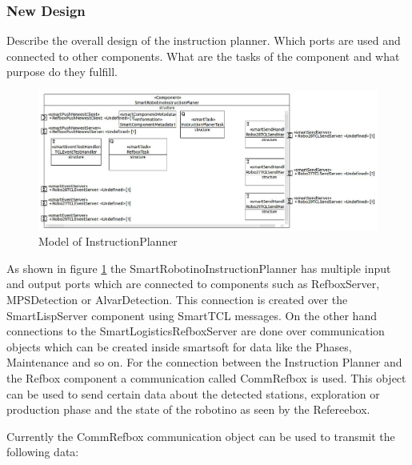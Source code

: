 \subsubsection{New Design}
\label{sec:new_design}
Describe the overall design of the instruction planner. Which ports are used and connected to other components. What are the tasks of the component and what purpose do they fulfill. 

\begin{figure}[h]
\centering
\includegraphics[scale=0.25]{pic/SmartRobotinoInstructionPlaner.JPG}
\caption{Model of InstructionPlanner}
\label{fig:i_overview}
\end{figure}


As shown in figure \ref{fig:i_overview} the SmartRobotinoInstructionPlanner has multiple input and output ports which are connected to components such as RefboxServer, MPSDetection or AlvarDetection. This connection is created over the SmartLispServer component using SmartTCL messages. On the other hand connections to the SmartLogisticsRefboxServer are done over communication objects which can be created inside smartsoft for data like the Phases, Maintenance and so on. For the connection between the Instruction Planner and the Refbox component a communication called CommRefbox is used. This object can be used to send certain data about the detected stations, exploration or production phase and the state of the robotino as seen by the 
Refereebox. \\

\newpage

Currently the CommRefbox communication object can be used to transmit the following data: 

